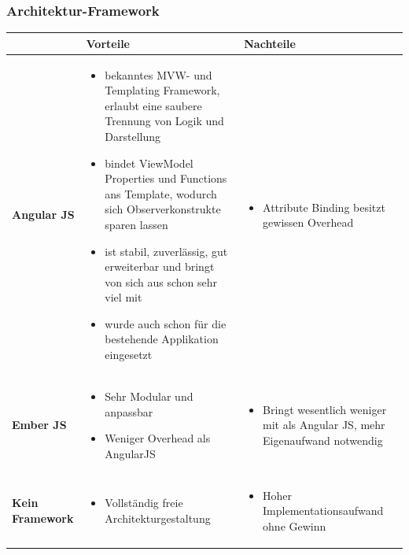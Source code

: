 			
		\subsubsection{Architektur-Framework}
			\begin{tabularx}{\textwidth}{|lXX|}
				\hline
					\textbf{} & \textbf{Vorteile} & \textbf{Nachteile}\\
				\hline
					\textbf{Angular JS} &
					\begin{itemize}
						\item bekanntes MVW- und Templating Framework, erlaubt eine saubere Trennung von Logik und Darstellung
						\item bindet ViewModel Properties und Functions ans Template, wodurch sich Observerkonstrukte sparen lassen
						\item ist stabil, zuverlässig, gut erweiterbar und bringt von sich aus schon sehr viel mit
						\item wurde auch schon für die bestehende Applikation eingesetzt
					\end{itemize} &
					\begin{itemize}
						\item Attribute Binding besitzt gewissen Overhead
					\end{itemize} \\
				\hline
					\textbf{Ember JS} &				
					\begin{itemize}
						\item Sehr Modular und anpassbar
						\item Weniger Overhead als AngularJS
					\end{itemize} &
					\begin{itemize}
						\item Bringt wesentlich weniger mit als Angular JS, mehr Eigenaufwand notwendig
					\end{itemize} \\
				\hline
					\textbf{Kein Framework} &
					\begin{itemize}
						\item Vollständig freie Architekturgestaltung
					\end{itemize} &
					\begin{itemize}
						\item Hoher Implementationsaufwand ohne Gewinn
					\end{itemize} \\
				\hline
			\end{tabularx}
			

